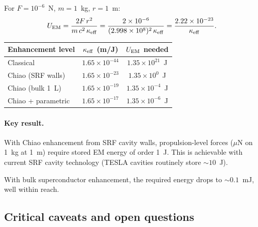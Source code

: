 \documentclass[12pt,aps,prd,twocolumn,superscriptaddress,nofootinbib]{revtex4-2}
\newcommand{\ee}[1]{\times 10^{#1}}
\begin{document}
For $F = 10^{-6}$~N, $m = 1$~kg, $r = 1$~m:
\begin{equation}
U_{\rm EM} = \frac{2F\,r^2}{m\,c^2\,\kappa_{\rm eff}}
= \frac{2\ee{-6}}{(2.998\ee{8})^2\,\kappa_{\rm eff}}
= \frac{2.22\ee{-23}}{\kappa_{\rm eff}}.
\end{equation}

\begin{center}
\begin{tabular}{lcc}
\toprule
Enhancement level & $\kappa_{\rm eff}$ (m/J) & $U_{\rm EM}$ needed \\
\midrule
Classical & $1.65\ee{-44}$ & $1.35\ee{21}$~J \\
Chiao (SRF walls) & $1.65\ee{-23}$ & $1.35\ee{0}$~J \\
Chiao (bulk 1~L) & $1.65\ee{-19}$ & $1.35\ee{-4}$~J \\
Chiao + parametric & $1.65\ee{-17}$ & $1.35\ee{-6}$~J \\
\bottomrule
\end{tabular}
\end{center}

\paragraph{Key result.} With Chiao enhancement from SRF cavity walls,
propulsion-level forces ($\mu$N on 1~kg at 1~m) require stored EM
energy of order 1~J. This is achievable with current SRF cavity
technology (TESLA cavities routinely store $\sim 10$~J).

With bulk superconductor enhancement, the required energy drops to
$\sim 0.1$~mJ, well within reach.

\subsection{Critical caveats and open questions}
\label{sec:caveats}
\end{document}
